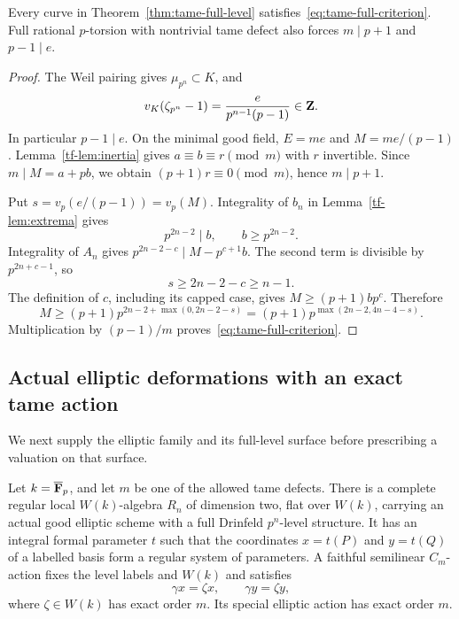 \begin{proposition}\label{tf-prop:necessity}
Every curve in Theorem~\ref{thm:tame-full-level} satisfies~\eqref{eq:tame-full-criterion}. Full rational $p$-torsion with nontrivial tame defect also forces $m\mid p+1$ and $p-1\mid e$.
\end{proposition}

\begin{proof}
The Weil pairing gives $\mu_{p^n}\subset K$, and
\[
 v_K(\zeta_{p^n}-1)=\frac{e}{p^{n-1}(p-1)}\in\mathbf Z.
\]
In particular $p-1\mid e$. On the minimal good field, $E=me$ and
$M=me/(p-1)$. Lemma~\ref{tf-lem:inertia} gives $a\equiv b\equiv r\pmod m$ with $r$ invertible. Since $m\mid M=a+pb$, we obtain $(p+1)r\equiv0\pmod m$, hence $m\mid p+1$.

Put $s=v_p(e/(p-1))=v_p(M)$. Integrality of $b_n$ in Lemma~\ref{tf-lem:extrema} gives
\[
 p^{2n-2}\mid b,\qquad b\ge p^{2n-2}.
\]
Integrality of $A_n$ gives $p^{2n-2-c}\mid M-p^{c+1}b$. The second term is divisible by $p^{2n+c-1}$, so
\[
 s\ge2n-2-c\ge n-1.
\]
The definition of $c$, including its capped case, gives $M\ge(p+1)bp^c$. Therefore
\[
 M\ge(p+1)p^{2n-2+\max(0,2n-2-s)}
       =(p+1)p^{\max(2n-2,4n-4-s)}.
\]
Multiplication by $(p-1)/m$ proves~\eqref{eq:tame-full-criterion}.
\end{proof}

\subsection{Actual elliptic deformations with an exact tame action}
We next supply the elliptic family and its full-level surface before prescribing a valuation on that surface.

\begin{lemma}\label{tf-lem:surface}
Let $k=\overline{\mathbf F}_p$, and let $m$ be one of the allowed tame defects. There is a complete regular local $W(k)$-algebra $R_n$ of dimension two, flat over $W(k)$, carrying an actual good elliptic scheme with a full Drinfeld $p^n$-level structure. It has an integral formal parameter $t$ such that the coordinates $x=t(P)$ and $y=t(Q)$ of a labelled basis form a regular system of parameters. A faithful semilinear $C_m$-action fixes the level labels and $W(k)$ and satisfies
\begin{equation}\label{tf-eq:scalar-action}
 \gamma x=\zeta x,\qquad\gamma y=\zeta y,
\end{equation}
where $\zeta\in W(k)$ has exact order $m$. Its special elliptic action has exact order $m$.
\end{lemma}

